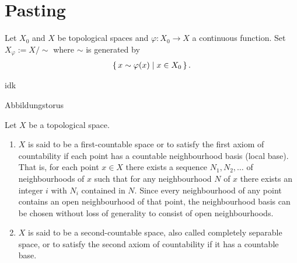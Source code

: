 \chapter{Pasting}

\begin{defbox}
    \begin{definition}
        Let \(X_0\) and \(X\) be topological spaces and \(\varphi: X_0 \longrightarrow X\) a continuous function. Set \(X_\varphi := X / \sim\) where \(\sim\) is generated by
        \begin{align*}
            \left\{\, x \sim \varphi(x) \mid x \in X_0 \,\right\} \text{.}
        \end{align*}
    \end{definition}
\end{defbox}

\begin{exmbox}
    \begin{example}
        idk
    \end{example}
\end{exmbox}

\begin{defbox}
    \begin{definition}
        Abbildungstorus
    \end{definition}
\end{defbox}

\begin{defbox}
    \begin{definition}
        Let \(X\) be a topological space.
        \begin{enumerate}
            \item \(X\) is said to be a first-countable space or to satisfy the first axiom of countability if each point has a countable neighbourhood basis (local base). That is, for each point \(x \in X\) there exists a sequence \(N_1, N_2, \ldots\) of neighbourhoods of \(x\) such that for any neighbourhood \(N\) of \(x\) there exists an integer \(i\) with \(N_i\) contained in \(N\). Since every neighbourhood of any point contains an open neighbourhood of that point, the neighbourhood basis can be chosen without loss of generality to consist of open neighbourhoods.
            \item \(X\) is said to be a second-countable space, also called completely separable space, or to satisfy the second axiom of countability if it has a countable base.
        \end{enumerate}
    \end{definition}
\end{defbox}

